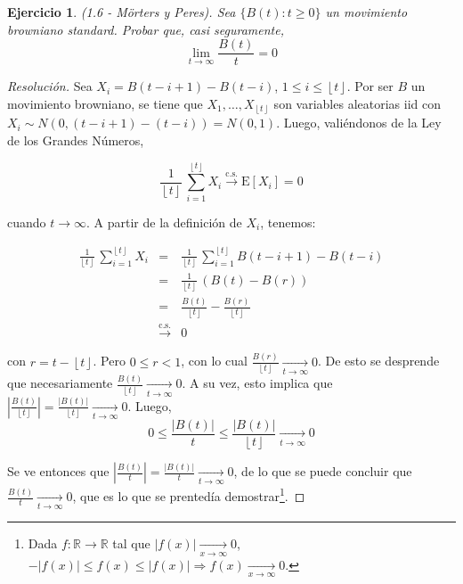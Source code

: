 \documentclass[a4paper,11pt]{article}
\newcommand{\floor}[1]{\ensuremath{\left\lfloor #1 \right\rfloor}}
\newtheorem*{ej}{Ejercicio}
\begin{document}

\begin{ej}
    (1.6 - Mörters y Peres). Sea $\{B(t) : t \geq 0\}$ un movimiento browniano
    standard. Probar que, casi seguramente,
    $$\lim_{t \to \infty}{\frac{B(t)}{t}} = 0$$ 
\end{ej}

\begin{proof}[Resoluci\'on]
Sea $X_i = B(t - i + 1) - B(t - i)$, $1 \leq i \leq \floor{t}$. Por ser $B$ un
movimiento browniano, se tiene que $X_1,\dots,X_{\floor{t}}$ son variables
aleatorias iid con $X_i \sim N(0, (t - i + 1) - (t-i)) = N(0,1)$. Luego,
valiéndonos de la Ley de los Grandes Números,

$$\frac{1}{\floor{t}} \, \sum_{i = 1}^{\floor{t}}{X_i}
    \stackrel{\textrm{c.s.}}{\longrightarrow} \textrm{E}[X_i] = 0$$

cuando $t \rightarrow \infty$. A partir de la definición de $X_i$, tenemos:

\begin{eqnarray*}
    \frac{1}{\floor{t}} \, \sum_{i = 1}^{\floor{t}}{X_i} 
    &=& \frac{1}{\floor{t}} \, \sum_{i = 1}^{\floor{t}}{B(t - i + 1) - B(t - i)} \\
    &=& \frac{1}{\floor{t}} \, \left(B(t) - B(r)\right) \\
    &=& \frac{B(t)}{\floor{t}} - \frac{B(r)}{\floor{t}} \\
    &\stackrel{\textrm{c.s.}}{\longrightarrow}& 0
\end{eqnarray*}

con $r = t - \floor{t}$. Pero $0 \leq r < 1$, con lo cual
$\frac{B(r)}{\floor{t}} \underset{t \to \infty}{\longrightarrow} 0$. 
De esto se desprende que necesariamente
$\frac{B(t)}{\floor{t}} \underset{t \to \infty}{\longrightarrow} 0$.
A su vez, esto implica que
$\left| \frac{B(t)}{\floor{t}} \right| =
\frac{\left|B(t)\right|}{\floor{t}}
\underset{t \to \infty}{\longrightarrow} 0$. Luego,
$$0 \leq \frac{\left|B(t)\right|}{t} \leq 
\frac{\left|B(t)\right|}{\floor{t}} \underset{t \to \infty}{\longrightarrow} 0$$

Se ve entonces que 
$\left| \frac{B(t)}{t} \right| =
\frac{|B(t)|}{t} \underset{t \to \infty}{\longrightarrow} 0$, de lo que se
puede concluir que $\frac{B(t)}{t} \underset{t \to \infty}{\longrightarrow} 0$,
que es lo que se prentedía demostrar\footnote
{Dada $f : \mathbb{R} \to \mathbb{R}$ tal que $|f(x)|
\underset{x \to \infty}{\longrightarrow} 0$,
$-|f(x)| \leq f(x) \leq |f(x)| \Rightarrow
f(x) \underset{x \to \infty}{\longrightarrow} 0$.}.


\end{proof}
\end{document}
